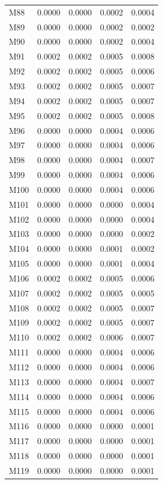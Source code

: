 \begin{longtable}{lrrrr}
M88 & 0.0000 & 0.0000 & 0.0002 & 0.0004 \\
M89 & 0.0000 & 0.0000 & 0.0002 & 0.0002 \\
M90 & 0.0000 & 0.0000 & 0.0002 & 0.0004 \\
M91 & 0.0002 & 0.0002 & 0.0005 & 0.0008 \\
M92 & 0.0002 & 0.0002 & 0.0005 & 0.0006 \\
M93 & 0.0002 & 0.0002 & 0.0005 & 0.0007 \\
M94 & 0.0002 & 0.0002 & 0.0005 & 0.0007 \\
M95 & 0.0002 & 0.0002 & 0.0005 & 0.0008 \\
M96 & 0.0000 & 0.0000 & 0.0004 & 0.0006 \\
M97 & 0.0000 & 0.0000 & 0.0004 & 0.0006 \\
M98 & 0.0000 & 0.0000 & 0.0004 & 0.0007 \\
M99 & 0.0000 & 0.0000 & 0.0004 & 0.0006 \\
M100 & 0.0000 & 0.0000 & 0.0004 & 0.0006 \\
M101 & 0.0000 & 0.0000 & 0.0000 & 0.0004 \\
M102 & 0.0000 & 0.0000 & 0.0000 & 0.0004 \\
M103 & 0.0000 & 0.0000 & 0.0000 & 0.0002 \\
M104 & 0.0000 & 0.0000 & 0.0001 & 0.0002 \\
M105 & 0.0000 & 0.0000 & 0.0001 & 0.0004 \\
M106 & 0.0002 & 0.0002 & 0.0005 & 0.0006 \\
M107 & 0.0002 & 0.0002 & 0.0005 & 0.0005 \\
M108 & 0.0002 & 0.0002 & 0.0005 & 0.0007 \\
M109 & 0.0002 & 0.0002 & 0.0005 & 0.0007 \\
M110 & 0.0002 & 0.0002 & 0.0006 & 0.0007 \\
M111 & 0.0000 & 0.0000 & 0.0004 & 0.0006 \\
M112 & 0.0000 & 0.0000 & 0.0004 & 0.0006 \\
M113 & 0.0000 & 0.0000 & 0.0004 & 0.0007 \\
M114 & 0.0000 & 0.0000 & 0.0004 & 0.0006 \\
M115 & 0.0000 & 0.0000 & 0.0004 & 0.0006 \\
M116 & 0.0000 & 0.0000 & 0.0000 & 0.0001 \\
M117 & 0.0000 & 0.0000 & 0.0000 & 0.0001 \\
M118 & 0.0000 & 0.0000 & 0.0000 & 0.0001 \\
M119 & 0.0000 & 0.0000 & 0.0000 & 0.0001 \\

\end{longtable}
